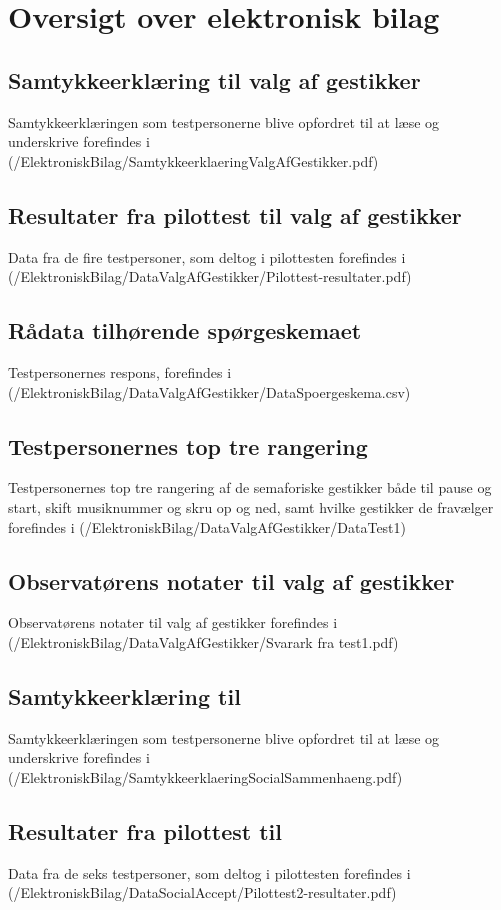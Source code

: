 \chapter{Oversigt over elektronisk bilag}
\label{app:OversigtOverElektroniskBilag}
%
%
\section{Samtykkeerklæring til valg af gestikker}
\label{app:SamtykkeerklaeringValgAfGestikker}
%
Samtykkeerklæringen som testpersonerne blive opfordret til at læse og underskrive forefindes i (/ElektroniskBilag/SamtykkeerklaeringValgAfGestikker.pdf)
%
\section{Resultater fra pilottest til valg af gestikker}
\label{app:ResultaterPilottestValgAfGestikker}
%
Data fra de fire testpersoner, som deltog i pilottesten forefindes i \\
(/ElektroniskBilag/DataValgAfGestikker/Pilottest-resultater.pdf)
%
\section{Rådata tilhørende spørgeskemaet}
\label{app:RaaDataSpoergeskema}
%
Testpersonernes respons, forefindes i (/ElektroniskBilag/DataValgAfGestikker/DataSpoergeskema.csv)
%
\section{Testpersonernes top tre rangering}
\label{app:TestpersonernesTopTre}
%
Testpersonernes top tre rangering af de semaforiske gestikker både til pause og start, skift musiknummer og skru op og ned, samt hvilke gestikker de fravælger forefindes i (/ElektroniskBilag/DataValgAfGestikker/DataTest1)
%
\section{Observatørens notater til valg af gestikker}
\label{app:NoterValgAfGestikker}
%
Observatørens notater til valg af gestikker forefindes i (/ElektroniskBilag/DataValgAfGestikker/Svarark fra test1.pdf)
%
\section{Samtykkeerklæring til }
\label{app:SamtykkeerklaeringSocialAccept}
%
Samtykkeerklæringen som testpersonerne blive opfordret til at læse og underskrive forefindes i (/ElektroniskBilag/SamtykkeerklaeringSocialSammenhaeng.pdf)
%
\section{Resultater fra pilottest til }
\label{app:ResultaterPilottestSocialAccept}
%
Data fra de seks testpersoner, som deltog i pilottesten forefindes i \\
(/ElektroniskBilag/DataSocialAccept/Pilottest2-resultater.pdf)
%
